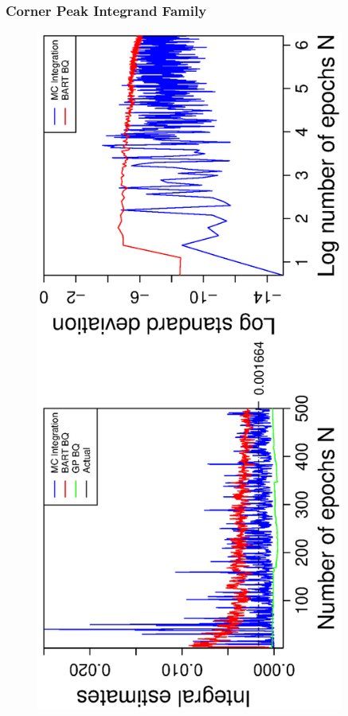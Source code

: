 \subsubsection*{Corner Peak Integrand Family}
\vspace{-1.5cm}
\begin{figure}[H]
  \centering
  \hspace{-1.6cm}
  \begin{minipage}[b]{0.4\textwidth}
    \includegraphics[width = 0.9\textwidth, angle = -90]{report/Figures/2/convergenceMean21Dimensions.eps}

\end{minipage}
\end{figure}
